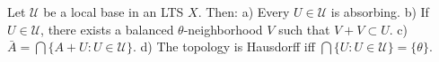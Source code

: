Let $\mathcal{U}$ be a local base in an LTS $X$. Then: a) Every $U \in \mathcal{U}$ is absorbing. b) If $U \in \mathcal{U}$, there exists a balanced $\theta$-neighborhood $V$ such that $V + V \subset U$. c) $\bar{A} = \bigcap\{A + U : U \in \mathcal{U}\}$. d) The topology is Hausdorff iff $\bigcap\{U : U \in \mathcal{U}\} = \{\theta\}$.